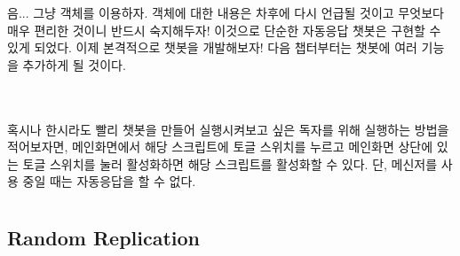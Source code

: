 \documentclass[10pt,a4paper,final]{book}
\begin{document}
음... 그냥 객체를 이용하자.
객체에 대한 내용은 차후에 다시 언급될 것이고 무엇보다 매우 편리한 것이니 반드시 숙지해두자!
이것으로 단순한 자동응답 챗봇은 구현할 수 있게 되었다.
이제 본격적으로 챗봇을 개발해보자! 다음 챕터부터는 챗봇에 여러 기능을 추가하게 될 것이다.
\\
\\
\\
\begin{screen}
혹시나 한시라도 빨리 챗봇을 만들어 실행시켜보고 싶은 독자를 위해 실행하는 방법을 적어보자면,
메인화면에서 해당 스크립트에 토글 스위치를 누르고 메인화면 상단에 있는 토글 스위치를 눌러
활성화하면 해당 스크립트를 활성화할 수 있다. 단, 메신저를 사용 중일 때는 자동응답을 할 수 없다.
\end{screen}

\chapter{}

\section{Random Replication}
\end{document}
